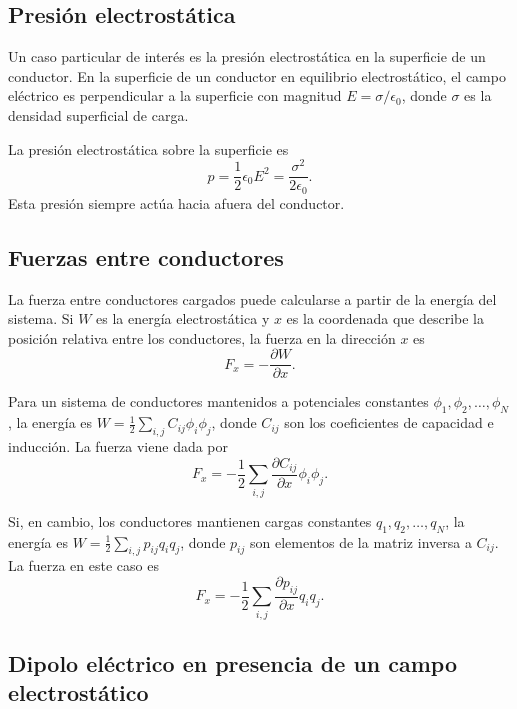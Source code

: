 \documentclass[12pt,a4paper]{book}
\begin{document}
\subsection{Presión electrostática}

Un caso particular de interés es la presión electrostática en la superficie de un conductor. En la superficie de un conductor en equilibrio electrostático, el campo eléctrico es perpendicular a la superficie con magnitud $E = \sigma/\epsilon_0$, donde $\sigma$ es la densidad superficial de carga.

La presión electrostática sobre la superficie es
\begin{equation}
p = \frac{1}{2} \epsilon_0 E^2 = \frac{\sigma^2}{2\epsilon_0}.
\end{equation}
Esta presión siempre actúa hacia afuera del conductor.

\subsection{Fuerzas entre conductores}

La fuerza entre conductores cargados puede calcularse a partir de la energía del sistema. Si $W$ es la energía electrostática y $x$ es la coordenada que describe la posición relativa entre los conductores, la fuerza en la dirección $x$ es
\begin{equation}
F_x = -\frac{\partial W}{\partial x}.
\end{equation}

Para un sistema de conductores mantenidos a potenciales constantes $\phi_1, \phi_2, \ldots, \phi_N$, la energía es $W = \frac{1}{2} \sum_{i,j} C_{ij}\phi_i\phi_j$, donde $C_{ij}$ son los coeficientes de capacidad e inducción. La fuerza viene dada por
\begin{equation}
F_x = -\frac{1}{2} \sum_{i,j} \frac{\partial C_{ij}}{\partial x}\phi_i\phi_j.
\end{equation}

Si, en cambio, los conductores mantienen cargas constantes $q_1, q_2, \ldots, q_N$, la energía es $W = \frac{1}{2} \sum_{i,j} p_{ij}q_i q_j$, donde $p_{ij}$ son elementos de la matriz inversa a $C_{ij}$. La fuerza en este caso es
\begin{equation}
F_x = -\frac{1}{2} \sum_{i,j} \frac{\partial p_{ij}}{\partial x}q_i q_j.
\end{equation}
\subsection{Dipolo eléctrico en presencia de un campo electrostático}
\end{document}
